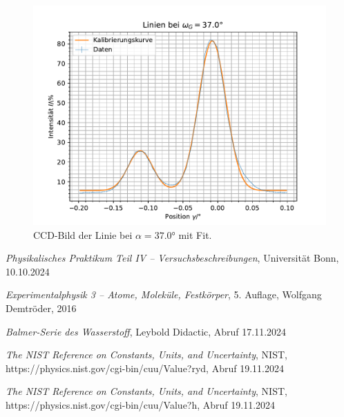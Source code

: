 \documentclass{article}
\begin{document}
\begin{figure}[h!]
  \begin{minipage}{0.49\textwidth}
    \includegraphics[width=\textwidth]{line37.0.pdf}
    \caption{CCD-Bild der Linie bei $\alpha=\ang{37.0}$ mit Fit.}
  \end{minipage}

  \label{fig:gauss-fit}
\end{figure}


\clearpage
\begin{thebibliography}{9}

\textit{Physikalisches Praktikum Teil IV -- Versuchsbeschreibungen}, Universität Bonn, 10.10.2024

\textit{Experimentalphysik 3 -- Atome, Moleküle, Festkörper}, 5. Auflage, Wolfgang Demtröder, 2016

\textit{Balmer-Serie des Wasserstoff}, Leybold Didactic, Abruf 17.11.2024

\textit{The NIST Reference on Constants, Units, and Uncertainty}, NIST, https://physics.nist.gov/cgi-bin/cuu/Value?ryd, Abruf 19.11.2024

\textit{The NIST Reference on Constants, Units, and Uncertainty}, NIST, https://physics.nist.gov/cgi-bin/cuu/Value?h, Abruf 19.11.2024

\end{thebibliography}
\end{document}
